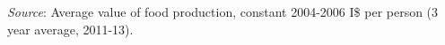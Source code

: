\footnotebar
\textit{Source}: Average value of food production, constant 2004-2006 I\$ per person (3 year average, 2011-13). 

